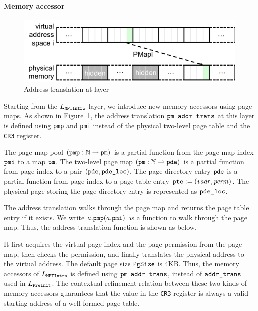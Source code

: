 \paragraph{Memory accessor}

\begin{figure}[t]\centering
\includegraphics[scale=.55]{figs/mem_model_2} 
\caption{Address translation at  layer}
\label{fig:seq:mem2}
\hrulefill
\end{figure}

Starting from the $L_\code{MPTIntro}$ layer, we 
introduce new memory accessors
using page maps.
As shown in Figure~\ref{fig:seq:mem2},
the
address translation $\code{pm\_addr\_trans}$ at this layer is defined
using \verb"pmp" and \verb"pmi" instead of the physical two-level page
table and the \verb"CR3" register. 

The page map pool $(\code{pmp}: \integer\partialf \code{pm})$
is a partial function from the page map index $\code{pmi}$
to a map $\code{pm}$.
The  two-level page map $(\code{pm} : \integer\partialf \code{pde})$
is a partial function  from page index to a pair 
$(\code{pde}, \code{pde\_loc})$.
The page directory entry 
$\code{pde}$
is a partial function from page index to a page table entry
$\code{pte}:=(\mathit{vadr}, \mathit{perm})$.
The physical page storing
the page directory entry is represented
as $\code{pde\_loc}$.

The address translation walks through
the page map and returns the page table entry if it exists.
We write $a.\code{pmp}(a.\code{pmi})$ as a function to walk
through the page map.
Thus, the address translation function is shown as below.
\begin{mathpar}
\end{mathpar}
It first acquires the virtual page index and the page permission
from the page map,
then checks the permission,
and finally translates the physical address
to the virtual address.
The default page size $\code{PgSize}$ is 4KB.
Thus, the memory accessors of $L_\code{MPTIntro}$ is defined
using $\code{pm\_addr\_trans}$, instead of
$\code{addr\_trans}$ used in $L_\code{PreInit}$.
 The contextual refinement relation
between these two kinds of memory accessors guarantees that the
value in the \verb"CR3" register is always a valid starting address of
a well-formed page table.




